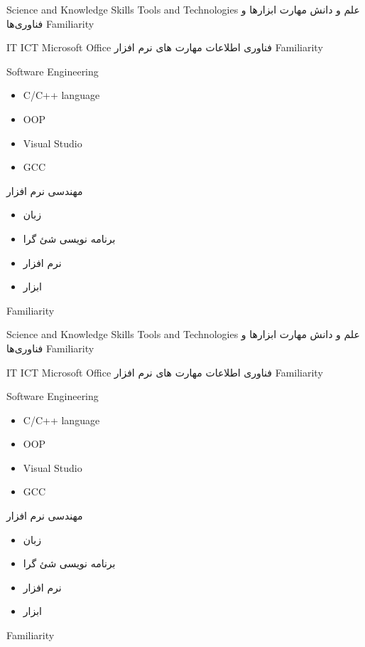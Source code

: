 
\craftC
{Science and Knowledge}
{Skills}
{Tools and Technologies}
{علم و دانش}
{مهارت}
{ابزارها و فناوری‌ها}
{Familiarity}


\craftC
{IT}
{ICT}
{Microsoft Office}
{فناوری اطلاعات}
{مهارت های }
{نرم افزار }
{Familiarity}


\craftC
{Software Engineering}
{\begin{itemize}
  \item C/C++ language
  \item OOP
\end{itemize}}
{\begin{itemize}
  \item Visual Studio
  \item GCC
\end{itemize}}
{مهندسی نرم افزار}
{\begin{itemize}
  \item زبان  
  \item برنامه نویسی شئ گرا
\end{itemize}}
{\begin{itemize}
  \item نرم افزار 
  \item ابزار 
\end{itemize}}
{Familiarity}


\craftC
{Science and Knowledge}
{Skills}
{Tools and Technologies}
{علم و دانش}
{مهارت}
{ابزارها و فناوری‌ها}
{Familiarity}


\craftC
{IT}
{ICT}
{Microsoft Office}
{فناوری اطلاعات}
{مهارت های }
{نرم افزار }
{Familiarity}


\craftC
{Software Engineering}
{\begin{itemize}
  \item C/C++ language
  \item OOP
\end{itemize}}
{\begin{itemize}
  \item Visual Studio
  \item GCC
\end{itemize}}
{مهندسی نرم افزار}
{\begin{itemize}
  \item زبان  
  \item برنامه نویسی شئ گرا
\end{itemize}}
{\begin{itemize}
  \item نرم افزار 
  \item ابزار 
\end{itemize}}
{Familiarity}
